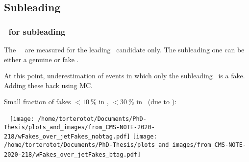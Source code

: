 \begin{frame}
\begin{minipage}[c]{.45\textwidth}
\begin{center}
\end{center}
\end{minipage}

\end{frame}

\subsection*{Subleading \ftauh}
\begin{frame}
\frametitle{\Fakefactors\ for subleading \tauh}

\manip The \tauh\tauh\ \fakefactors\ are measured for the leading \tauh\ candidate only.
\submanip The subleading one can be either a genuine or fake \tauh.

\manip At this point, underestimation of events in which only the subleading \tauh\ is a fake.
\submanip Adding these back using MC.

\manip Small fraction of fakes $<\SI{10}{\%}$ in \CATnobtag, $<\SI{30}{\%}$ in \CATbtag\ (due to \ttbar):

~\hfill
\texttt{[image: /home/torterotot/Documents/PhD-Thesis/plots\_and\_images/from\_CMS-NOTE-2020-218/wFakes\_over\_jetFakes\_nobtag.pdf]}
\hfill
\texttt{[image: /home/torterotot/Documents/PhD-Thesis/plots\_and\_images/from\_CMS-NOTE-2020-218/wFakes\_over\_jetFakes\_btag.pdf]}
\hfill~

\vspace{-5pt}


\end{frame}